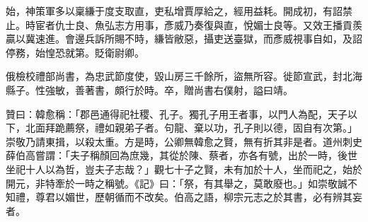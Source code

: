 \begin{pinyinscope}
 始，神策軍多以稟縑于度支取直，吏私增賈厚給之，經用益耗。開成初，有詔禁止。時宦者仇士良、魚弘志方用事，彥威乃奏復與直，悅媚士良等。又效王播貢羨贏以冀速進。會邊兵訴所賜不時，縑皆敝惡，攝吏送臺獄，而彥威視事自如，及詔停務，始惶恐就第。貶衛尉卿。



 俄檢校禮部尚書，為忠武節度使，毀山房三千餘所，盜無所容。徙節宣武，封北海縣子。性強敏，善著書，頗行於時。卒，贈尚書右僕射，謚曰靖。



 贊曰：韓愈稱：「郡邑通得祀社稷、孔子。獨孔子用王者事，以門人為配，天子以下，北面拜跪薦祭，禮如親弟子者。句龍、棄以功，孔子則以德，固自有次第。」崇敬乃請東揖，以殺太重。方是時，公卿無韓愈之賢，無有折其非是者。道州刺史薛伯高嘗謂：「夫子稱顏回為庶幾，其從於陳、蔡者，亦各有號，出於一時，後世坐祀十人以為哲，豈夫子志哉？」觀七十子之賢，未有加於十人，坐而祀之，始於開元，非特牽於一時之稱號。《記》曰：「祭，有其舉之，莫敢廢也。」如崇敬誠不知禮，尊君以媚世，歷朝循而不改矣。伯高之語，柳宗元志之於其書，必有辨其妄者。



\end{pinyinscope}